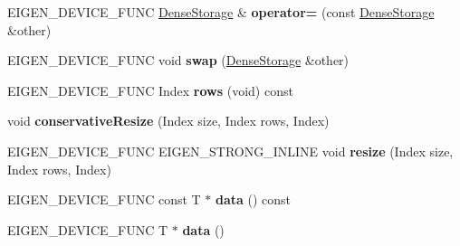 \begin{DoxyCompactItemize}
E\+I\+G\+E\+N\+\_\+\+D\+E\+V\+I\+C\+E\+\_\+\+F\+U\+NC \mbox{\hyperlink{class_eigen_1_1_dense_storage}{Dense\+Storage}} \& {\bfseries operator=} (const \mbox{\hyperlink{class_eigen_1_1_dense_storage}{Dense\+Storage}} \&other)
\item 
\mbox{\label{class_eigen_1_1_dense_storage_3_01_t_00_01_dynamic_00_01_dynamic_00_01___cols_00_01___options_01_4_a2050b0570b67bef5e0f1f87e26ac8a16}} 
E\+I\+G\+E\+N\+\_\+\+D\+E\+V\+I\+C\+E\+\_\+\+F\+U\+NC void {\bfseries swap} (\mbox{\hyperlink{class_eigen_1_1_dense_storage}{Dense\+Storage}} \&other)
\item 
\mbox{\label{class_eigen_1_1_dense_storage_3_01_t_00_01_dynamic_00_01_dynamic_00_01___cols_00_01___options_01_4_acb5a90954a9c788561cfc38a8f015268}} 
E\+I\+G\+E\+N\+\_\+\+D\+E\+V\+I\+C\+E\+\_\+\+F\+U\+NC Index {\bfseries rows} (void) const
\item 
\mbox{\label{class_eigen_1_1_dense_storage_3_01_t_00_01_dynamic_00_01_dynamic_00_01___cols_00_01___options_01_4_a6c822479c506d3c4b23668266aba9881}} 
void {\bfseries conservative\+Resize} (Index size, Index rows, Index)
\item 
\mbox{\label{class_eigen_1_1_dense_storage_3_01_t_00_01_dynamic_00_01_dynamic_00_01___cols_00_01___options_01_4_a196e886b11ac1970ce040f9075b2d578}} 
E\+I\+G\+E\+N\+\_\+\+D\+E\+V\+I\+C\+E\+\_\+\+F\+U\+NC E\+I\+G\+E\+N\+\_\+\+S\+T\+R\+O\+N\+G\+\_\+\+I\+N\+L\+I\+NE void {\bfseries resize} (Index size, Index rows, Index)
\item 
\mbox{\label{class_eigen_1_1_dense_storage_3_01_t_00_01_dynamic_00_01_dynamic_00_01___cols_00_01___options_01_4_af628da2b0d718f6502c46881aae94b4e}} 
E\+I\+G\+E\+N\+\_\+\+D\+E\+V\+I\+C\+E\+\_\+\+F\+U\+NC const T $\ast$ {\bfseries data} () const
\item 
\mbox{\label{class_eigen_1_1_dense_storage_3_01_t_00_01_dynamic_00_01_dynamic_00_01___cols_00_01___options_01_4_a1291ab3ce4690ef6e32caa582ca9f75e}} 
E\+I\+G\+E\+N\+\_\+\+D\+E\+V\+I\+C\+E\+\_\+\+F\+U\+NC T $\ast$ {\bfseries data} ()
\end{DoxyCompactItemize}

